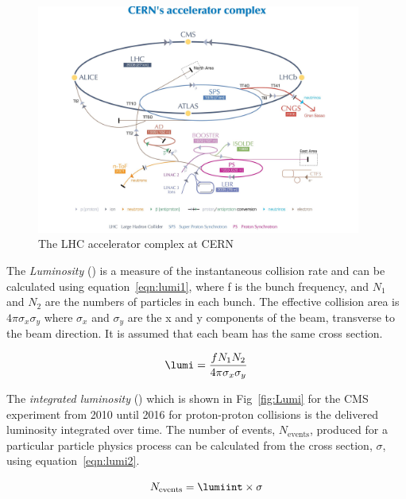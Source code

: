 \begin{figure}[ht!]
\centering
    \includegraphics[width=0.95\textwidth]{images/LHCacc.jpg}
    \caption{The LHC accelerator complex at CERN}
    \label{fig:LHC acc}
\end{figure}


The \emph{Luminosity} (\lumi) is a measure of the instantaneous collision rate and can be calculated using equation~\ref{eqn:lumi1}, where f is the bunch frequency, and $N_1$ and $N_2$ are the numbers of particles in each bunch. The effective collision area is $4\pi\sigma_{x}\sigma_{y}$ where $\sigma_{x}$ and $\sigma_{y}$ are the x and y components of the beam, transverse to the beam direction. It is assumed that each beam has the same cross section.

\begin{equation}
\lumi = \frac{f{N}_{1}{N}_{2}}{4\pi\sigma_{x}\sigma_{y}}
\label{eqn:lumi1}
\end{equation}

The \emph{integrated luminosity} (\lumiint) which is shown in Fig~\ref{fig:Lumi} for the CMS experiment from 2010 until 2016 for proton-proton collisions is the delivered luminosity integrated over time. The number of events, $N_{\textrm{events}}$, produced for a particular particle physics process can be calculated from the cross section, $\sigma$, using equation~\ref{eqn:lumi2}.

\begin{equation}
N_{\textrm{events}} = \lumiint \times \sigma
\label{eqn:lumi2}
\end{equation}

